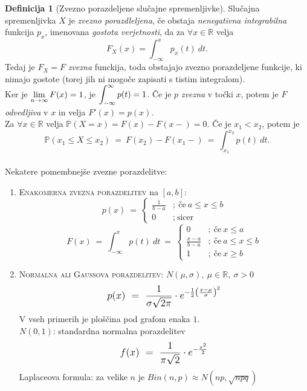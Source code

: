 \documentclass[11pt]{article}
\theoremstyle{definition}
\newtheorem{definicija}{Definicija}[section]
\theoremstyle{definition}
\theoremstyle{definition}
\begin{document}
\begin{definicija}[Zvezno porazdeljene slučajne spremenljivke]

Slučajna spremenljivka $X$ je \textit{zvezno porazdleljena}, če obstaja \textit{nenegativna integrabilna} funkcija $p_x$, imenovana \textit{gostota verjetnosti}, da za $\forall x \in \mathbb{R}$ velja
$$F_X(x) = \int_{-\infty}^x p_x(t) ~dt.$$
Tedaj je $F_X = F$ \textit{zvezna} funckija, toda obstajajo zvezno porazdeljene funkcije, ki nimajo gostote (torej jih ni mogoče zapisati s tistim integralom). \\

\noindent Ker je $\mathlarger{\lim_{n \rightarrow \infty} F(x) = 1}$, je $\mathlarger{\int_{-\infty}^{\infty} p(t) = 1}$. Če je $p$ \textit{zvezna} v točki $x$, potem je $F$ \textit{odvedljiva} v $x$ in velja $F'(x) = p(x)$. \\

\noindent Za $\forall x \in \mathbb{R}$ velja $\mathbb{P}(X = x) = F(x) - F(x-) = 0$. Če je $x_1 < x_2$, potem je 
$$\mathbb{P}(x_1 \leq X \leq x_2) ~=~ F(x_2) - F(x_1-) ~=~ \int_{x_1}^{x_2} p(t) ~dt.$$ \\

\noindent Nekatere pomembnejše zvezne porazdelitve:
\begin{enumerate}
	\item \textsc{Enakomerna zvezna porazdelitev} na $[a, b]$:
	 $$p(x) ~=~ \begin{cases}
	 	\frac{1}{b-a} &; ~\text{če}~ a \leq x \leq b \\
	 	0 &; ~\text{sicer}
	 \end{cases}$$
	 $$F(x) ~=~ \int_{-\infty}^x p(t) ~dt ~=~ \begin{cases}
	 	0 &; ~\text{če}~ x \leq a \\
	 	\frac{x-a}{b-a} &; ~\text{če}~ a \leq x \leq b \\
	 	1 &; ~\text{če}~ x \geq b
	 \end{cases}$$
	 
	\item \textsc{Normalna ali Gaussova porazdelitev}: $N(\mu, \sigma), ~\mu \in \mathbb{R}, ~\sigma > 0$
	$$\mathlarger{p(x)~=~ \frac{1}{\sigma \sqrt{2 \pi}} \cdot e^{-\frac{1}{2} \left( \frac{x-\mu}{\sigma} \right)^2}}$$
V vseh primerih je ploščina pod grafom enaka $1$. \\

$N(0, 1)$: standardna normalna porazdelitev
$$\mathlarger{f(x) ~=~ \frac{1}{\pi \sqrt{2}} \cdot e^{-\frac{x^2}{2}}}$$
Laplaceova formula: za velike $n$ je $Bin(n, p) \approx N(np, \sqrt{npq})$


\end{enumerate}
\end{definicija}
\end{document}
